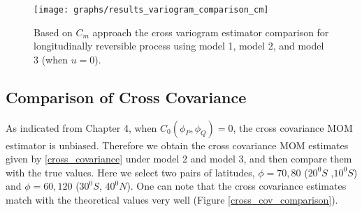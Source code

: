 \begin{figure}[H]
	\centering
	\texttt{[image: graphs/results\_variogram\_comparison\_cm]}
	\caption[Based on $C_m$ Approach the Cross Variogram Estimator Comparison]{Based on $C_m$ approach the cross variogram estimator comparison for longitudinally reversible process using  model 1, model 2, and model 3 (when $u=0$).}
	\label{logitudinal_comparison_cm}
\end{figure}


\subsection{Comparison of Cross Covariance}

As indicated from Chapter 4, when $C_0(\phi_P, \phi_Q) = 0$, the cross covariance MOM estimator is unbiased. Therefore we obtain the cross covariance MOM estimates given by \eqref{cross_covariance} under model 2 and model 3, and then compare them with the true values. Here we select two pairs of latitudes, $\phi = 70, 80$ ($20^0S$ ,$10^0S$) and $\phi = 60, 120$ ($30^0S$, $40^0N$). One can note that the cross covariance estimates match with the theoretical values very well (Figure \ref{cross_cov_comparison}).


% 
% 

